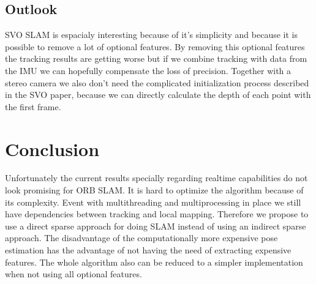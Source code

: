\documentclass[11pt,a4paper,titlepage,oneside]{report}
\begin{document}
\section{Outlook}
SVO SLAM is espacialy interesting because of it's simplicity and because it is possible to remove a lot of optional features. By removing this optional features the tracking results are getting worse but if we combine tracking with data from the IMU we can hopefully compensate the loss of precision. Together with a stereo camera we also don't need the complicated initialization process described in the SVO paper, because we can directly calculate the depth of each point with the first frame.

\chapter{Conclusion}
Unfortunately the current results specially regarding realtime capabilities do not look promising for ORB SLAM. It is hard to optimize the algorithm because of its complexity. Event with multithreading and multiprocessing in place we still have dependencies between tracking and local mapping. Therefore we propose to use a direct sparse approach for doing SLAM instead of using an indirect sparse approach. The disadvantage of the computationally more expensive pose estimation has the advantage of not having the need of extracting expensive features. The whole algorithm also can be reduced to a simpler implementation when not using all optional features.

\listoffigures
 
\end{document}
